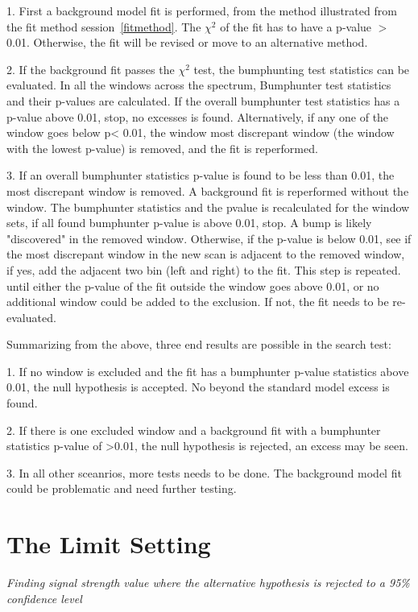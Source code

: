     1.  First a background model fit is performed, from the method illustrated from the fit method session~\ref{fitmethod}. The $\chi^{2}$ of the fit has to have a p-value $>$ 0.01. Otherwise, the fit will be revised or move to an alternative method.

    2.  If the background fit passes the $\chi^{2}$ test, the bumphunting test statistics can be evaluated. In all the windows across the spectrum, Bumphunter test statistics and their p-values are calculated. If the overall bumphunter test statistics has a p-value above 0.01, stop, no excesses is found. Alternatively, if any one of the window goes below p< 0.01, the window most discrepant window (the window with the lowest p-value) is removed, and the fit is reperformed.

    3. If an overall bumphunter statistics p-value is found to be less than 0.01, the most discrepant window is removed. A background fit is reperformed without the window. The bumphunter statistics and the pvalue is recalculated for the window sets, if all found bumphunter p-value is above 0.01, stop. A bump is likely "discovered" in the removed window. Otherwise, if the p-value is below 0.01, see if the most discrepant window in the new scan is adjacent to the removed window, if yes, add the adjacent two bin (left and right) to the fit. This step is repeated. until either the p-value of the fit outside the window goes above 0.01, or no additional window could be added to the exclusion. If not, the fit needs to be re-evaluated.

    Summarizing from the above, three end results are possible in the search test:

    1. If no window is excluded and the fit has a bumphunter p-value statistics above 0.01, the null hypothesis is accepted. No beyond the standard model excess is found. 

    2. If there is one excluded window and a background fit with a bumphunter statistics p-value of >0.01, the null hypothesis is rejected, an excess may be seen. 

    3. In all other sceanrios, more tests needs to be done. The background model fit could be problematic and need further testing.  

\section{The Limit Setting}

\textit{Finding signal strength value where the alternative hypothesis is rejected to a 95\% confidence level}

